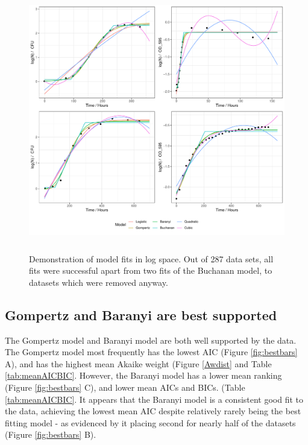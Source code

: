\documentclass[11pt, a4paper]{article}
\begin{document}
\begin{linenumbers}
                \begin{figure}[H]
                \centering
        \includegraphics[height=4.5in]{../results/model_fits.pdf}
        \caption{Demonstration of model fits in log space. Out of 287 data sets, all fits were successful apart from two fits of the Buchanan model, to datasets which were removed anyway. }
        \label{fig:model_fits}
        \end{figure}

\subsection{Gompertz and Baranyi are best supported}

The Gompertz model and Baranyi model are both well supported by the data. The Gompertz model most frequently has the lowest AIC (Figure \ref{fig:bestbars} A), and has the highest mean Akaike weight (Figure \ref{Awdist} and Table \ref{tab:meanAICBIC}. However, the Baranyi model has a lower mean ranking (Figure \ref{fig:bestbars} C), and lower mean AICs and BICs. (Table \ref{tab:meanAICBIC}. It appears that the Baranyi model is a consistent good fit to the data, achieving the lowest mean AIC despite relatively rarely being the best fitting model - as evidenced by it placing second for nearly half of the datasets (Figure \ref{fig:bestbars} B).




\end{linenumbers}
\end{document}
